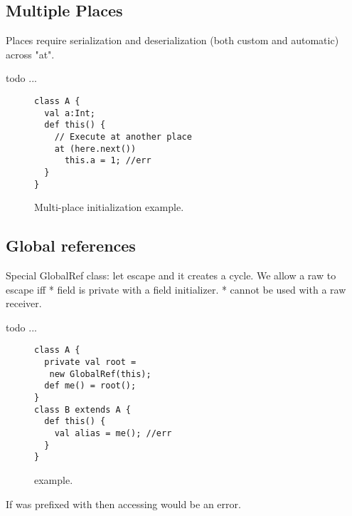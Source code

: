 \subsection{Multiple Places}
Places require serialization and deserialization (both custom and automatic) across "at".

 todo ...

\begin{figure}
\begin{lstlisting}
class A {
  val a:Int;
  def this() {
    // Execute at another place
    at (here.next())
      this.a = 1; //err
  }
}
\end{lstlisting}
\caption{Multi-place initialization example.
    }
\label{Figure:Multi-place}
\end{figure}


\subsection{Global references}
Special GlobalRef class: let \this escape and it creates a cycle.
We allow a raw \this to escape iff
* field is private with a field initializer.
* cannot be used with a raw \this receiver.


 todo ...

\begin{figure}
\begin{lstlisting}
class A {
  private val root =
   new GlobalRef(this);
  def me() = root();
}
class B extends A {
  def this() {
    val alias = me(); //err
  }
}
\end{lstlisting}
\caption{ example.
    }
\label{Figure:GlobalRef}
\end{figure}

If  was prefixed with
then accessing  would be an error.




